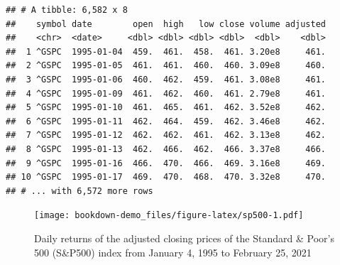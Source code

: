 \documentclass[]{book}
\newenvironment{Shaded}{\begin{snugshade}}{\end{snugshade}}
\newcommand{\CommentTok}[1]{\textcolor[rgb]{0.56,0.35,0.01}{\textit{#1}}}
\newcommand{\DataTypeTok}[1]{\textcolor[rgb]{0.13,0.29,0.53}{#1}}
\newcommand{\KeywordTok}[1]{\textcolor[rgb]{0.13,0.29,0.53}{\textbf{#1}}}
\newcommand{\NormalTok}[1]{#1}
\newcommand{\OperatorTok}[1]{\textcolor[rgb]{0.81,0.36,0.00}{\textbf{#1}}}
\newcommand{\StringTok}[1]{\textcolor[rgb]{0.31,0.60,0.02}{#1}}
\begin{document}
\begin{verbatim}
## # A tibble: 6,582 x 8
##    symbol date        open  high   low close volume adjusted
##    <chr>  <date>     <dbl> <dbl> <dbl> <dbl>  <dbl>    <dbl>
##  1 ^GSPC  1995-01-04  459.  461.  458.  461. 3.20e8     461.
##  2 ^GSPC  1995-01-05  461.  461.  460.  460. 3.09e8     460.
##  3 ^GSPC  1995-01-06  460.  462.  459.  461. 3.08e8     461.
##  4 ^GSPC  1995-01-09  461.  462.  460.  461. 2.79e8     461.
##  5 ^GSPC  1995-01-10  461.  465.  461.  462. 3.52e8     462.
##  6 ^GSPC  1995-01-11  462.  464.  459.  462. 3.46e8     462.
##  7 ^GSPC  1995-01-12  462.  462.  461.  462. 3.13e8     462.
##  8 ^GSPC  1995-01-13  462.  466.  462.  466. 3.37e8     466.
##  9 ^GSPC  1995-01-16  466.  470.  466.  469. 3.16e8     469.
## 10 ^GSPC  1995-01-17  469.  470.  468.  470. 3.32e8     470.
## # ... with 6,572 more rows
\end{verbatim}

\begin{Shaded}
\end{Shaded}

\begin{figure}
\centering
\texttt{[image: bookdown-demo\_files/figure-latex/sp500-1.pdf]}
\caption{\label{fig:sp500}Daily returns of the adjusted closing prices of the Standard \& Poor's 500 (S\&P500) index from January 4, 1995 to February 25, 2021}
\end{figure}
\end{document}
